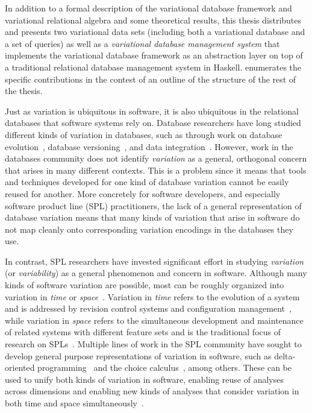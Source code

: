 In addition to a formal description of the variational database framework and
variational relational algebra and some theoretical results,
this thesis distributes and presents two variational data sets (including both a variational
database and a set of queries) as well as a \emph{variational database management system}
that implements the variational database framework as an abstraction layer on top of a 
traditional relational database management system in Haskell.
 enumerates the specific contributions in the contest of an outline
of the structure of the rest of the thesis. 

Just as variation is ubiquitous in software, it is also ubiquitous in the
relational databases that software systems rely on.
%
Database researchers have long studied different kinds of variation in
databases, such as through work on database
evolution~\cite{schVersioning97Castro,SchEvolRA90McKenzie,prima08Moon},
database versioning~\cite{datasetVersioning,dbVersioning}, and data
integration~\cite{dataIntegBook}.
%
However, work in the databases community does not identify \emph{variation} as
a general, orthogonal concern that arises in many different contexts.
%
This is a problem since it means that tools and techniques developed for one
kind of database variation cannot be easily reused for another. More concretely
for software developers, and especially software product line (SPL)
practitioners, the lack of a general representation of database variation means
that many kinds of variation that arise in software do not map cleanly onto
corresponding variation encodings in the databases they use.



In contrast, SPL researchers have invested significant effort in studying
\emph{variation} (or \emph{variability}) as a general phenomenon and concern in
software.
%
Although many kinds of software variation are possible, most can be roughly
organized into variation in \emph{time} or \emph{space}~\cite{Thu19vv}.
Variation in \emph{time} refers to the evolution of a system and is addressed
by revision control systems and configuration management~\cite{Dart91}, while
variation in \emph{space} refers to the simultaneous development and
maintenance of related systems with different feature sets and is the
traditional focus of research on SPLs~\cite{FOSPL16}.
%
Multiple lines of work in the SPL community have sought to develop general
purpose representations of variation in software, such as delta-oriented
programming~\cite{Schaefer10dop} and the choice calculus~\cite{EW11tosem},
among others. These can be used to unify both kinds of variation in software,
enabling reuse of analyses across dimensions and enabling new kinds of analyses
that consider variation in both time and space simultaneously~\cite{Thu19vv}.

